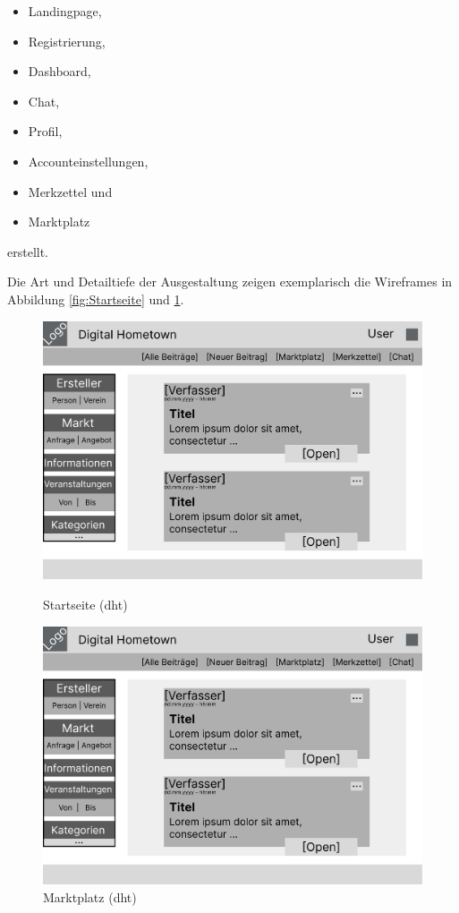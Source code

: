 \begin{itemize}
    \item Landingpage,
    \item Registrierung,
    \item Dashboard,
    \item Chat,
    \item Profil,
    \item Accounteinstellungen,
    \item Merkzettel und
    \item Marktplatz
\end{itemize}

erstellt.

Die Art und Detailtiefe der Ausgestaltung zeigen exemplarisch die Wireframes in Abbildung \ref{fig:Startseite} und \ref{fig:Marktplatz}.

\begin{figure}[!htb]
    \begin{minipage}[t]{0.5\textwidth}
        \includegraphics[page=2, width=1\textwidth]{figures/jan/wire_example.pdf}
        \caption[Startseite (\acrshort{dht})]{Startseite (\acrshort{dht})}
        \label{fig:Startseite}
    \end{minipage}
    \begin{minipage}[t]{0.5\textwidth}
        \includegraphics[page=1, width=1\textwidth]{figures/jan/wire_example.pdf}
        \caption[Marktplatz (\acrshort{dht})]{Marktplatz (\acrshort{dht})}
        \label{fig:Marktplatz}
    \end{minipage}
\end{figure}
